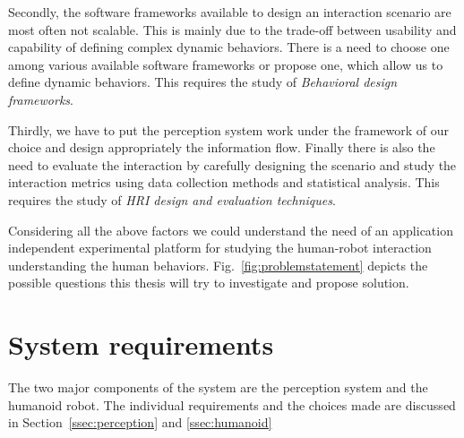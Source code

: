 	Secondly, the software frameworks available to design an interaction scenario are most often not scalable. This is mainly due to the trade-off between usability and capability of defining complex dynamic behaviors. There is a need to choose one among various available software frameworks or propose one, which allow us to define dynamic behaviors. This requires the study of \emph{Behavioral design frameworks}.

	Thirdly, we have to put the perception system work under the framework of our choice and design appropriately the information flow. Finally there is also the need to evaluate the interaction by carefully designing the scenario and study the interaction metrics using data collection methods and statistical analysis. This requires the study of \emph{HRI design and evaluation techniques}.

	Considering all the above factors we could understand the need of an application independent experimental platform for studying the human-robot interaction understanding the human behaviors. Fig.~\ref{fig:problemstatement} depicts the possible questions this thesis will try to investigate and propose solution. 


\section{System requirements}
The two major components of the system are the perception system and the humanoid robot. The individual requirements and the choices made are discussed in Section~\ref{ssec:perception} and \ref{ssec:humanoid}
